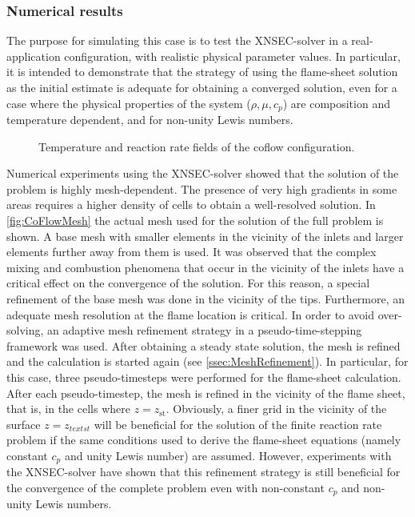 \subsubsection{Numerical results}
The purpose for simulating this case is to test the XNSEC-solver in a real-application configuration, with realistic physical parameter values. In particular, it is intended to demonstrate that the strategy of using the flame-sheet solution as the initial estimate is adequate for obtaining a converged solution, even for a case where the physical properties of the system ($\rho, \mu, c_p$) are composition and temperature dependent, and for non-unity Lewis numbers. 
\begin{figure}[t!]
	\centering
	\pgfplotsset{width=0.6\textwidth, compat=1.3}
	\hspace{-2.4cm} 	
	\caption{Temperature and reaction rate fields of the coflow configuration.} \label{fig:CoFlowFlameFig}
\end{figure}
Numerical experiments using the XNSEC-solver showed that the solution of the problem is highly mesh-dependent. The presence of very high gradients in some areas requires a higher density of cells to obtain a well-resolved solution.  In \cref{fig:CoFlowMesh} the actual mesh used for the solution of the full problem is shown.  A base mesh with smaller elements in the vicinity of the inlets and larger elements further away from them is used. It was observed that the complex mixing and combustion phenomena that occur in the vicinity of the inlets have a critical effect on the convergence of the solution. For this reason, a special refinement of the base mesh was done in the vicinity of the tips. Furthermore, an adequate mesh resolution  at the flame location is critical. In order to avoid over-solving, an adaptive mesh refinement strategy in a pseudo-time-stepping framework was used. After obtaining a steady state solution, the mesh is refined and the calculation is started again (see \cref{ssec:MeshRefinement}). In particular, for this case, three pseudo-timesteps were performed for the flame-sheet calculation. After each pseudo-timestep, the mesh is refined in the vicinity of the flame sheet, that is, in the cells where $z = z_{\text{st}}$. 
Obviously, a finer grid in the vicinity of the surface $z = z_{text{st}}$ will be beneficial for the solution of the finite reaction rate problem if the same conditions used to derive the flame-sheet equations (namely constant $c_p$ and unity Lewis number) are assumed.  
However, experiments with the XNSEC-solver have shown that this refinement strategy is still beneficial for the convergence of the complete problem even with non-constant $c_p$ and non-unity Lewis numbers.


